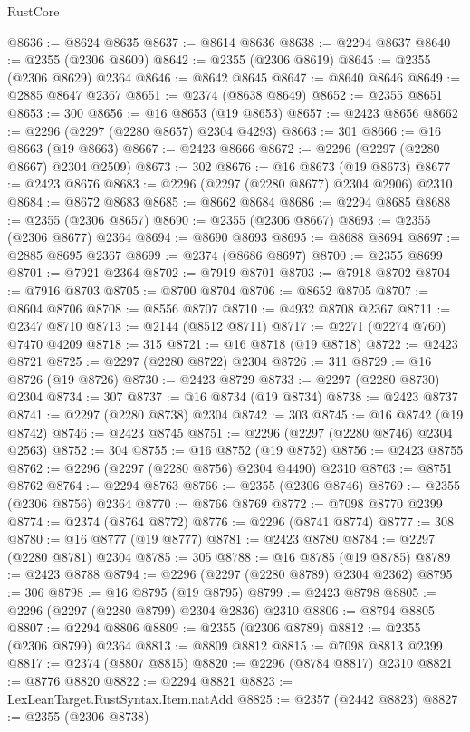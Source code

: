 \begin{lexlean}{RustCore}
\begin{coremodule}
@8636 := @8624 @8635
@8637 := @8614 @8636
@8638 := @2294 @8637
@8640 := @2355 (@2306 @8609)
@8642 := @2355 (@2306 @8619)
@8645 := @2355 (@2306 @8629) @2364
@8646 := @8642 @8645
@8647 := @8640 @8646
@8649 := @2885 @8647 @2367
@8651 := @2374 (@8638 @8649)
@8652 := @2355 @8651
@8653 := 300
@8656 := @16 @8653 (@19 @8653)
@8657 := @2423 @8656
@8662 := @2296 (@2297 (@2280 @8657) @2304 @4293)
@8663 := 301
@8666 := @16 @8663 (@19 @8663)
@8667 := @2423 @8666
@8672 := @2296 (@2297 (@2280 @8667) @2304 @2509)
@8673 := 302
@8676 := @16 @8673 (@19 @8673)
@8677 := @2423 @8676
@8683 := @2296 (@2297 (@2280 @8677) @2304 @2906) @2310
@8684 := @8672 @8683
@8685 := @8662 @8684
@8686 := @2294 @8685
@8688 := @2355 (@2306 @8657)
@8690 := @2355 (@2306 @8667)
@8693 := @2355 (@2306 @8677) @2364
@8694 := @8690 @8693
@8695 := @8688 @8694
@8697 := @2885 @8695 @2367
@8699 := @2374 (@8686 @8697)
@8700 := @2355 @8699
@8701 := @7921 @2364
@8702 := @7919 @8701
@8703 := @7918 @8702
@8704 := @7916 @8703
@8705 := @8700 @8704
@8706 := @8652 @8705
@8707 := @8604 @8706
@8708 := @8556 @8707
@8710 := @4932 @8708 @2367
@8711 := @2347 @8710
@8713 := @2144 (@8512 @8711)
@8717 := @2271 (@2274 @760) @7470 @4209
@8718 := 315
@8721 := @16 @8718 (@19 @8718)
@8722 := @2423 @8721
@8725 := @2297 (@2280 @8722) @2304
@8726 := 311
@8729 := @16 @8726 (@19 @8726)
@8730 := @2423 @8729
@8733 := @2297 (@2280 @8730) @2304
@8734 := 307
@8737 := @16 @8734 (@19 @8734)
@8738 := @2423 @8737
@8741 := @2297 (@2280 @8738) @2304
@8742 := 303
@8745 := @16 @8742 (@19 @8742)
@8746 := @2423 @8745
@8751 := @2296 (@2297 (@2280 @8746) @2304 @2563)
@8752 := 304
@8755 := @16 @8752 (@19 @8752)
@8756 := @2423 @8755
@8762 := @2296 (@2297 (@2280 @8756) @2304 @4490) @2310
@8763 := @8751 @8762
@8764 := @2294 @8763
@8766 := @2355 (@2306 @8746)
@8769 := @2355 (@2306 @8756) @2364
@8770 := @8766 @8769
@8772 := @7098 @8770 @2399
@8774 := @2374 (@8764 @8772)
@8776 := @2296 (@8741 @8774)
@8777 := 308
@8780 := @16 @8777 (@19 @8777)
@8781 := @2423 @8780
@8784 := @2297 (@2280 @8781) @2304
@8785 := 305
@8788 := @16 @8785 (@19 @8785)
@8789 := @2423 @8788
@8794 := @2296 (@2297 (@2280 @8789) @2304 @2362)
@8795 := 306
@8798 := @16 @8795 (@19 @8795)
@8799 := @2423 @8798
@8805 := @2296 (@2297 (@2280 @8799) @2304 @2836) @2310
@8806 := @8794 @8805
@8807 := @2294 @8806
@8809 := @2355 (@2306 @8789)
@8812 := @2355 (@2306 @8799) @2364
@8813 := @8809 @8812
@8815 := @7098 @8813 @2399
@8817 := @2374 (@8807 @8815)
@8820 := @2296 (@8784 @8817) @2310
@8821 := @8776 @8820
@8822 := @2294 @8821
@8823 := LexLeanTarget.RustSyntax.Item.natAdd
@8825 := @2357 (@2442 @8823)
@8827 := @2355 (@2306 @8738)

\end{coremodule}
\end{lexlean}

